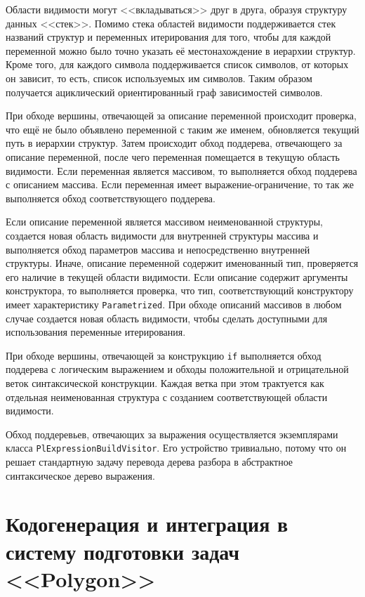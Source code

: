 \documentclass[times,specification,annotation]{style/itmo-student-thesis/itmo-student-thesis}
\begin{document}
Области видимости могут <<вкладываться>> друг в друга, образуя структуру данных <<стек>>. Помимо стека областей видимости поддерживается стек названий структур и переменных итерирования для того, чтобы для каждой переменной можно было точно указать её местонахождение в иерархии структур. Кроме того, для каждого символа поддерживается список символов, от которых он зависит, то есть, список используемых им символов. Таким образом получается ациклический ориентированный граф зависимостей символов.

При обходе вершины, отвечающей за описание переменной происходит проверка, что ещё не было объявлено переменной с таким же именем, обновляется текущий путь в иерархии структур. Затем происходит обход поддерева, отвечающего за описание переменной, после чего переменная помещается в текущую область видимости. Если переменная является массивом, то выполняется обход поддерева с описанием массива. Если переменная имеет выражение-ограничение, то так же выполняется обход соответствующего поддерева.

Если описание переменной является массивом неименованной структуры, создается новая область видимости для внутренней структуры массива и выполняется обход параметров массива и непосредственно внутренней структуры. Иначе, описание переменной содержит именованный тип, проверяется его наличие в текущей области видимости. Если описание содержит аргументы конструктора, то выполняется проверка, что тип, соответствующий конструктору имеет характеристику \texttt{Parametrized}. При обходе описаний массивов в любом случае создается новая область видимости, чтобы сделать доступными для использования переменные итерирования.

При обходе вершины, отвечающей за конструкцию \texttt{if} выполняется обход поддерева с логическим выражением и обходы положительной и отрицательной веток синтаксической конструкции. Каждая ветка при этом трактуется как отдельная неименованная структура с созданием соответствующей области видимости.

Обход поддеревьев, отвечающих за выражения осуществляется экземплярами класса \texttt{PlExpressionBuildVisitor}. Его устройство тривиально, потому что он решает стандартную задачу перевода дерева разбора в абстрактное синтаксическое дерево выражения.

\chapter{Кодогенерация и интеграция в систему подготовки задач <<Polygon>>}
\end{document}
